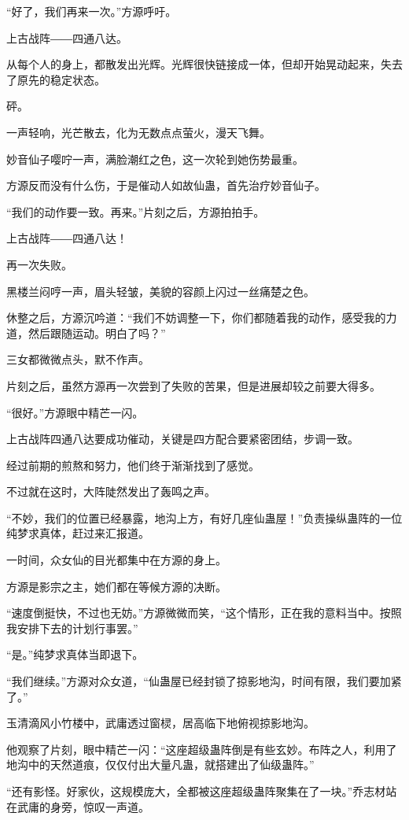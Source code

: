 \begin{this_body}
“好了，我们再来一次。”方源呼吁。

上古战阵――四通八达。

从每个人的身上，都散发出光辉。光辉很快链接成一体，但却开始晃动起来，失去了原先的稳定状态。

砰。

一声轻响，光芒散去，化为无数点点萤火，漫天飞舞。

妙音仙子嘤咛一声，满脸潮红之色，这一次轮到她伤势最重。

方源反而没有什么伤，于是催动人如故仙蛊，首先治疗妙音仙子。

“我们的动作要一致。再来。”片刻之后，方源拍拍手。

上古战阵――四通八达！

再一次失败。

黑楼兰闷哼一声，眉头轻皱，美貌的容颜上闪过一丝痛楚之色。

休整之后，方源沉吟道：“我们不妨调整一下，你们都随着我的动作，感受我的力道，然后跟随运动。明白了吗？”

三女都微微点头，默不作声。

片刻之后，虽然方源再一次尝到了失败的苦果，但是进展却较之前要大得多。

“很好。”方源眼中精芒一闪。

上古战阵四通八达要成功催动，关键是四方配合要紧密团结，步调一致。

经过前期的煎熬和努力，他们终于渐渐找到了感觉。

不过就在这时，大阵陡然发出了轰鸣之声。

“不妙，我们的位置已经暴露，地沟上方，有好几座仙蛊屋！”负责操纵蛊阵的一位纯梦求真体，赶过来汇报道。

一时间，众女仙的目光都集中在方源的身上。

方源是影宗之主，她们都在等候方源的决断。

“速度倒挺快，不过也无妨。”方源微微而笑，“这个情形，正在我的意料当中。按照我安排下去的计划行事罢。”

“是。”纯梦求真体当即退下。

“我们继续。”方源对众女道，“仙蛊屋已经封锁了掠影地沟，时间有限，我们要加紧了。”

玉清滴风小竹楼中，武庸透过窗棂，居高临下地俯视掠影地沟。

他观察了片刻，眼中精芒一闪：“这座超级蛊阵倒是有些玄妙。布阵之人，利用了地沟中的天然道痕，仅仅付出大量凡蛊，就搭建出了仙级蛊阵。”

“还有影怪。好家伙，这规模庞大，全都被这座超级蛊阵聚集在了一块。”乔志材站在武庸的身旁，惊叹一声道。


\end{this_body}
